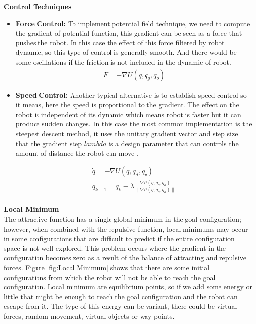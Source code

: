 \noindent \textbf {Control Techniques}
\begin{itemize}
      \item  \textbf{ Force Control: }
To implement potential field technique, we need to compute the gradient of potential function, this gradient can be seen as a force that pushes the robot. In this case the effect of this force filtered by robot dynamic, so this type of control is generally smooth. And there would be some oscillations if the friction is not included in the dynamic of robot. 
\begin{equation}
\begin{aligned}
F = -\nabla U(q, q_g, q_o)
\end{aligned}
\label{eqn:Force Control}
\end{equation} 
      \item  \textbf{ Speed Control: }
Another typical alternative is to establish speed control so it means, here the speed is proportional to the gradient. The effect on the robot is independent of its dynamic which means robot is faster but it can produce sudden changes. In this case the most common implementation is the steepest descent method, it uses the unitary gradient vector and step size that the gradient step $lambda$ is a design parameter that can controls the amount of distance the robot can move \cite{LocalMinimum}.

\begin{equation}
\begin{aligned}
\dot{q} = -\nabla U(q, q_d, q_o) \\
q_{k+1} = q_k - \lambda \frac{\nabla U(q, q_d, q_o)}{\| \nabla U(q, q_d, q_o) \|}\\
\end{aligned}
\label{eqn:Speed Control}
\end{equation} 
\end{itemize}

\noindent \textbf {Local Minimum}\\
The attractive function has a single global minimum in the goal configuration; however, when combined with the repulsive function, local minimums may occur in some configurations that are difficult to predict if the entire configuration space is not well explored. This problem occurs where the gradient in the configuration becomes zero as a result of the balance of attracting and repulsive forces. Figure \ref{fig:Local Minimum} shows that there are some initial configurations from which the robot will not be able to reach the goal configuration. Local minimum are equilibrium points, so if we add some energy or little that might be enough to reach the goal configuration and the robot can escape from it. The type of this energy can be variant, there could be virtual forces, random movement, virtual objects or way-points.  

